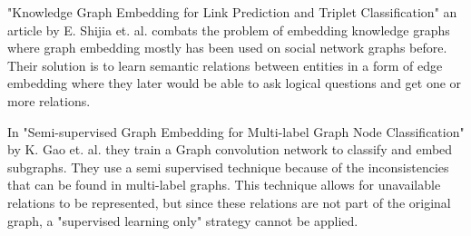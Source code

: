 "Knowledge Graph Embedding for Link Prediction and Triplet Classification" an article by E. Shijia et. al.\cite{10.1007/978-981-10-3168-7_23} combats the problem of embedding knowledge graphs where graph embedding mostly has been used on social network graphs before.  Their solution is to learn semantic relations between entities in a form of edge embedding where they later would be able to ask logical questions and get one or more relations.

In "Semi-supervised Graph Embedding for Multi-label Graph Node Classification" by K. Gao et. al.\cite{10.1007/978-3-030-34223-4_35} they train a Graph convolution network to classify and embed subgraphs. They use a semi supervised technique because of the inconsistencies that can be found in multi-label graphs. This technique allows for unavailable relations to be represented, but since these relations are not part of the original graph, a "supervised learning only" strategy cannot be applied.

